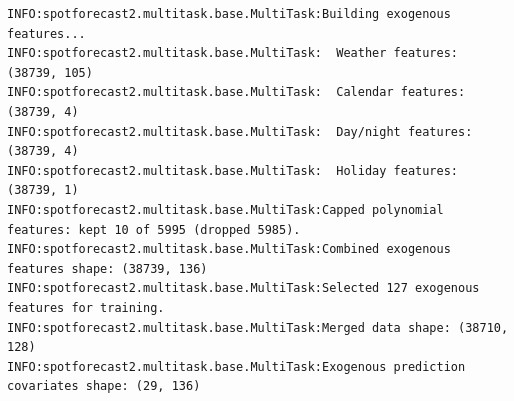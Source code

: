 \documentclass[
  english,
  letterpaper,
]{scrbook}
\begin{document}
\begin{verbatim}
INFO:spotforecast2.multitask.base.MultiTask:Building exogenous features...
INFO:spotforecast2.multitask.base.MultiTask:  Weather features: (38739, 105)
INFO:spotforecast2.multitask.base.MultiTask:  Calendar features: (38739, 4)
INFO:spotforecast2.multitask.base.MultiTask:  Day/night features: (38739, 4)
INFO:spotforecast2.multitask.base.MultiTask:  Holiday features: (38739, 1)
INFO:spotforecast2.multitask.base.MultiTask:Capped polynomial features: kept 10 of 5995 (dropped 5985).
INFO:spotforecast2.multitask.base.MultiTask:Combined exogenous features shape: (38739, 136)
INFO:spotforecast2.multitask.base.MultiTask:Selected 127 exogenous features for training.
INFO:spotforecast2.multitask.base.MultiTask:Merged data shape: (38710, 128)
INFO:spotforecast2.multitask.base.MultiTask:Exogenous prediction covariates shape: (29, 136)
\end{verbatim}
\end{document}
